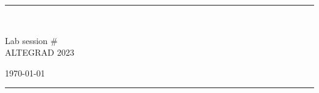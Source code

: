 \fancyhead[C]{}
\hrule \medskip
\begin{minipage}{0.295\textwidth} 
\raggedright
\footnotesize
\yourname \hfill\\
\youremail
\end{minipage}
\begin{minipage}{0.4\textwidth} 
\centering 
\large 
Lab session \# \assignmentnumber\\ 
\normalsize 
ALTEGRAD 2023\\ 
\end{minipage}
\begin{minipage}{0.295\textwidth} 
\raggedleft
\today\hfill\\
\end{minipage}
\medskip\hrule 
\bigskip
